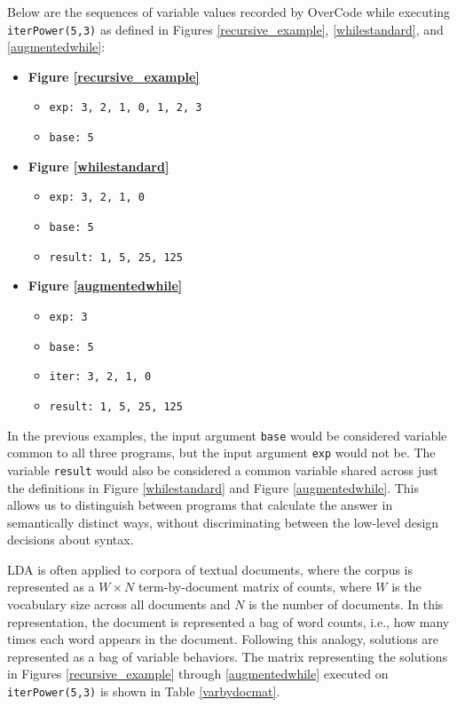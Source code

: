 Below are the sequences of variable values recorded by OverCode while executing \texttt{iterPower(5,3)} as defined in Figures \ref{recursive_example}, \ref{whilestandard}, and \ref{augmentedwhile}:
\begin{itemize}
  \item {\bf Figure \ref{recursive_example}}
  \begin{itemize}
  \setlength\itemsep{0.05em}
  \item \texttt{exp: 3, 2, 1, 0, 1, 2, 3}
  \item \texttt{base: 5}
  \end{itemize}
  \item {\bf Figure \ref{whilestandard}}
  \begin{itemize}
  \item \texttt{exp: 3, 2, 1, 0}
  \item \texttt{base: 5}
  \item \texttt{result: 1, 5, 25, 125}
  \end{itemize}
  \item {\bf Figure \ref{augmentedwhile}}
  \begin{itemize}
  \item \texttt{exp: 3}
  \item \texttt{base: 5}
  \item \texttt{iter: 3, 2, 1, 0}
  \item \texttt{result: 1, 5, 25, 125}
  \end{itemize}
\end{itemize}

In the previous examples, the input argument \texttt{base} would be considered variable common to all three programs, but the input argument \texttt{exp} would not be. The variable \texttt{result} would also be considered a common variable shared across just the definitions in Figure \ref{whilestandard} and Figure \ref{augmentedwhile}. This allows us to distinguish between programs that calculate the answer in semantically distinct ways, without discriminating between the low-level design decisions about syntax. 

LDA is often applied to corpora of textual documents, where the corpus is represented as a $W \times N$ term-by-document matrix of counts, where $W$ is the vocabulary size across all documents and $N$ is the number of documents. In this representation, the document is represented a bag of word counts, i.e., how many times each word appears in the document. Following this analogy, solutions are represented as a bag of variable behaviors. The matrix representing the solutions in Figures \ref{recursive_example} through \ref{augmentedwhile} executed on \texttt{iterPower(5,3)} is shown in Table \ref{varbydocmat}.

